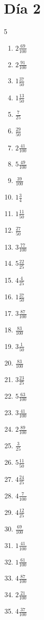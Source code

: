 \documentclass[12pt]{article}
\begin{document}
\section*{Día 2}
\begin{multicols}{5}\begin{enumerate}
\item $ 2 \frac{69}{100} $
\item $ 2 \frac{91}{100} $
\item $ 1 \frac{37}{50} $
\item $ 1 \frac{13}{50} $
\item $ \frac{7}{25} $
\item $ \frac{29}{50} $
\item $ 2 \frac{41}{100} $
\item $ 5 \frac{49}{100} $
\item $ \frac{39}{100} $
\item $ 1 \frac{3}{4} $
\item $ 1 \frac{11}{50} $
\item $ \frac{27}{50} $
\item $ 3 \frac{77}{100} $
\item $ 5 \frac{22}{25} $
\item $ 4 \frac{4}{25} $
\item $ 1 \frac{37}{50} $
\item $ 3 \frac{87}{100} $
\item $ \frac{83}{100} $
\item $ 3 \frac{1}{50} $
\item $ \frac{83}{100} $
\item $ 3 \frac{23}{25} $
\item $ 5 \frac{63}{100} $
\item $ 3 \frac{41}{100} $
\item $ 2 \frac{89}{100} $
\item $ \frac{3}{25} $
\item $ 5 \frac{11}{50} $
\item $ 4 \frac{24}{25} $
\item $ 4 \frac{7}{100} $
\item $ 4 \frac{12}{25} $
\item $ \frac{69}{100} $
\item $ 1 \frac{41}{100} $
\item $ 1 \frac{61}{100} $
\item $ 4 \frac{87}{100} $
\item $ 2 \frac{21}{100} $
\item $ 4 \frac{37}{100} $

\end{enumerate}
\end{multicols}
\end{document}

